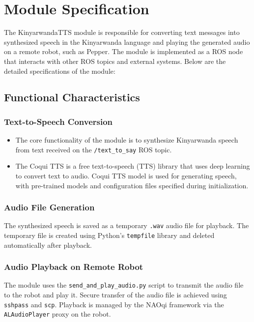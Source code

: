 \documentclass{CSSRforAfrica}
\begin{document}
\newpage
\section{Module Specification}
The KinyarwandaTTS module is responsible for converting text messages into synthesized speech in the Kinyarwanda language and playing the generated audio on a remote robot, such as Pepper. The module is implemented as a ROS node that interacts with other ROS topics and external systems. Below are the detailed specifications of the module:

\subsection{Functional Characteristics}

\subsubsection{Text-to-Speech Conversion}
\begin{itemize}
    \item The core functionality of the module is to synthesize  Kinyarwanda speech 
    from text received on the 
\texttt{/text\_to\_say}
ROS topic.
    \item The Coqui TTS is a free text-to-speech (TTS) library that uses deep learning to convert text to audio. Coqui TTS model is used for generating speech, with pre-trained models and 
    configuration files specified during initialization.
\end{itemize}

\subsubsection{Audio File Generation}
The synthesized speech is saved as a temporary \texttt{.wav} audio file for playback. The temporary file is created using Python's \texttt{tempfile} library and deleted automatically after playback.

\subsubsection{Audio Playback on Remote Robot}
The module uses the \texttt{send\_and\_play\_audio.py} script to transmit the audio file to the robot and play it. Secure transfer of the audio file is achieved using \texttt{sshpass} and \texttt{scp}. Playback is managed by the NAOqi framework via the \texttt{ALAudioPlayer} proxy on the robot.
\end{document}
